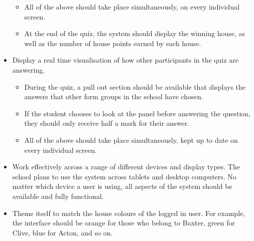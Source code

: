 \begin{itemize}
\begin{itemize}
			\item All of the above should take place simultaneously, on every individual screen.

			\item At the end of the quiz, the system should display the winning house, as well as the number of house points earned by each house.
		\end{itemize}

	\item Display a real time visualisation of how other participants in the quiz are answering.

		\begin{itemize}
			\item During the quiz, a pull out section should be available that displays the answers that other form groups in the school have chosen.

			\item If the student chooses to look at the panel before answering the question, they should only receive half a mark for their answer.

			\item All of the above should take place simultaneously, kept up to date on every individual screen.
		\end{itemize}

	\item Work effectively across a range of different devices and display types. The school plans to use the system across tablets and desktop computers. No matter which device a user is using, all aspects of the system should be available and fully functional.

	\item Theme itself to match the house colours of the logged in user. For example, the interface should be orange for those who belong to Baxter, green for Clive, blue for Acton, and so on.
\end{itemize}
